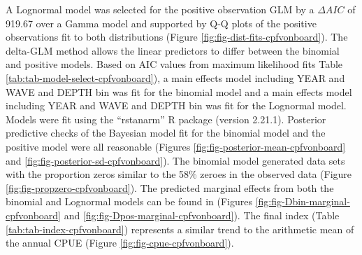 \documentclass[11pt,
  english,
  a4paper,
]{article}
\begin{document}
A Lognormal model was selected for the positive observation GLM by a {\(\Delta AIC\)\leavevmode\tagmcend\tagstructend} of 919.67 over a Gamma model and supported by Q-Q plots of the positive observations fit to both distributions (Figure \ref{fig:fig-dist-fits-cpfvonboard}). The delta-GLM method allows the linear predictors to differ between the binomial and positive models. Based on AIC values from maximum likelihood fits Table \ref{tab:tab-model-select-cpfvonboard}), a main effects model including YEAR and WAVE and DEPTH bin was fit for the binomial model and a main effects model including YEAR and WAVE and DEPTH bin was fit for the Lognormal model. Models were fit using the ``rstanarm'' R package (version 2.21.1). Posterior predictive checks of the Bayesian model fit for the binomial model and the positive model were all reasonable (Figures \ref{fig:fig-posterior-mean-cpfvonboard} and \ref{fig:fig-posterior-sd-cpfvonboard}). The binomial model generated data sets with the proportion zeros similar to the 58\% zeroes in the observed data (Figure \ref{fig:fig-propzero-cpfvonboard}). The predicted marginal effects from both the binomial and Lognormal models can be found in (Figures \ref{fig:fig-Dbin-marginal-cpfvonboard} and \ref{fig:fig-Dpos-marginal-cpfvonboard}). The final index (Table \ref{tab:tab-index-cpfvonboard}) represents a similar trend to the arithmetic mean of the annual CPUE (Figure \ref{fig:fig-cpue-cpfvonboard}).

\newpage
\end{document}
